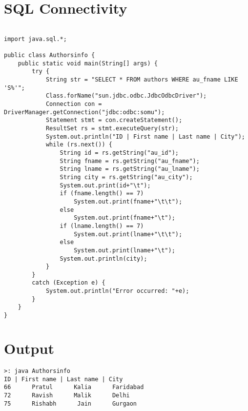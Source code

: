 \pagebreak{}
\section{SQL Connectivity}
\begin{verbatim}

import java.sql.*;

public class Authorsinfo {
    public static void main(String[] args) {
        try {
            String str = "SELECT * FROM authors WHERE au_fname LIKE 'S%'";
            Class.forName("sun.jdbc.odbc.JdbcOdbcDriver");
            Connection con = DriverManager.getConnection("jdbc:odbc:somu");
            Statement stmt = con.createStatement();
            ResultSet rs = stmt.executeQuery(str);
            System.out.println("ID | First name | Last name | City");
            while (rs.next()) {
                String id = rs.getString("au_id");
                String fname = rs.getString("au_fname");
                String lname = rs.getString("au_lname");
                String city = rs.getString("au_city");
                System.out.print(id+"\t");
                if (fname.length() == 7)
                    System.out.print(fname+"\t\t");
                else
                    System.out.print(fname+"\t");
                if (lname.length() == 7)
                    System.out.print(lname+"\t\t");
                else
                    System.out.print(lname+"\t");
                System.out.println(city);
            }
        }
        catch (Exception e) {
            System.out.println("Error occurred: "+e);
        }
    }
}
\end{verbatim}
\section*{Output}
\begin{verbatim}
>: java Authorsinfo
ID | First name | Last name | City
66      Pratul      Kalia      Faridabad
72      Ravish      Malik      Delhi
75      Rishabh      Jain      Gurgaon
\end{verbatim}